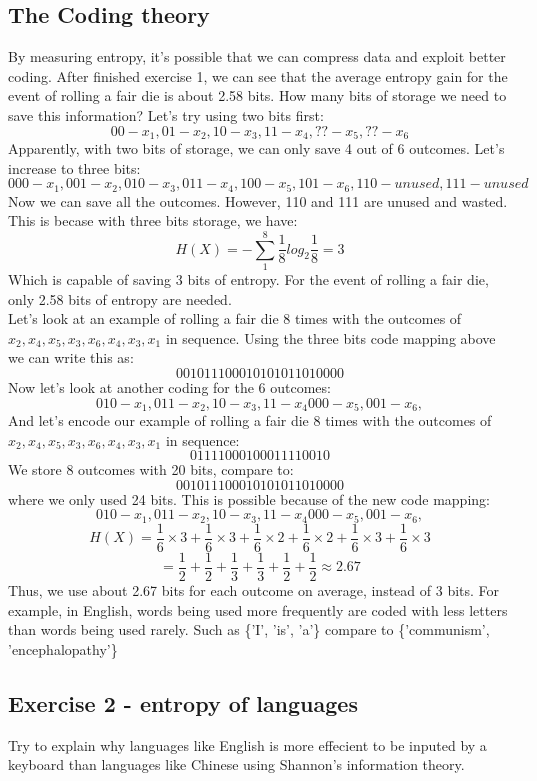 \documentclass[12pt]{article}
\begin{document}
\subsection{The Coding theory}
By measuring entropy, it's possible that we can compress data and exploit better coding. 
After finished exercise 1, we can see that the average entropy gain for the event of rolling a fair die is about 2.58 bits. How many bits of storage we need to save this information? Let's try using two bits first:
\[
	00 - x_1,
	01 - x_2,
	10 - x_3,
	11 - x_4,
	?? - x_5,
	?? - x_6
\]
Apparently, with two bits of storage, we can only save 4 out of 6 outcomes. Let's increase to three bits:
\[
	000 - x_1,
	001 - x_2,
	010 - x_3,
	011 - x_4,
	100 - x_5,
	101 - x_6,
	110 - unused,
	111 - unused
\]
Now we can save all the outcomes. However, 110 and 111 are unused and wasted. This is becase with three bits storage, we have:
\[
	H(X) = - \sum_1^8 \frac{1}{8} log_2 \frac{1}{8} = 3
\]
Which is capable of saving 3 bits of entropy. For the event of rolling a fair die, only 2.58 bits of entropy are needed.\\
Let's look at an example of rolling a fair die 8 times with the outcomes of $x_2,x_4,x_5,x_3,x_6,x_4,x_3,x_1$ in sequence. Using the three bits code mapping above we can write this as:
\[
	001011100010101011010000
\]
Now let's look at another coding for the 6 outcomes:
\[
	010 - x_1,
	011 - x_2,
	10 - x_3,
	11 - x_4
	000 - x_5,
	001 - x_6,
\]
And let's encode our example of rolling a fair die 8 times with the outcomes of $x_2,x_4,x_5,x_3,x_6,x_4,x_3,x_1$ in sequence:
\[
	01111000100011110010
\]
We store 8 outcomes with 20 bits, compare to:
\[
	001011100010101011010000
\]
where we only used 24 bits. This is possible because of the new code mapping:
\[
	010 - x_1,
	011 - x_2,
	10 - x_3,
	11 - x_4
	000 - x_5,
	001 - x_6,
\]
\[
	H(X) = \frac{1}{6} \times 3 + \frac{1}{6} \times 3 + \frac{1}{6} \times 2 + \frac{1}{6} \times 2 + \frac{1}{6} \times 3 + \frac{1}{6} \times 3
\]
\[
	= \frac{1}{2} + \frac{1}{2}+ \frac{1}{3}+ \frac{1}{3}+ \frac{1}{2}+ \frac{1}{2} \approx 2.67
\]
Thus, we use about 2.67 bits for each outcome on average, instead of 3 bits. For example, in English, words being used more frequently are coded with less letters than words being used rarely. Such as \{'I', 'is', 'a'\} compare to \{'communism', 'encephalopathy'\}

\subsection{Exercise 2 - entropy of languages}
Try to explain why languages like English is more effecient to be inputed by a keyboard than languages like Chinese using Shannon's information theory.\\
\end{document}
